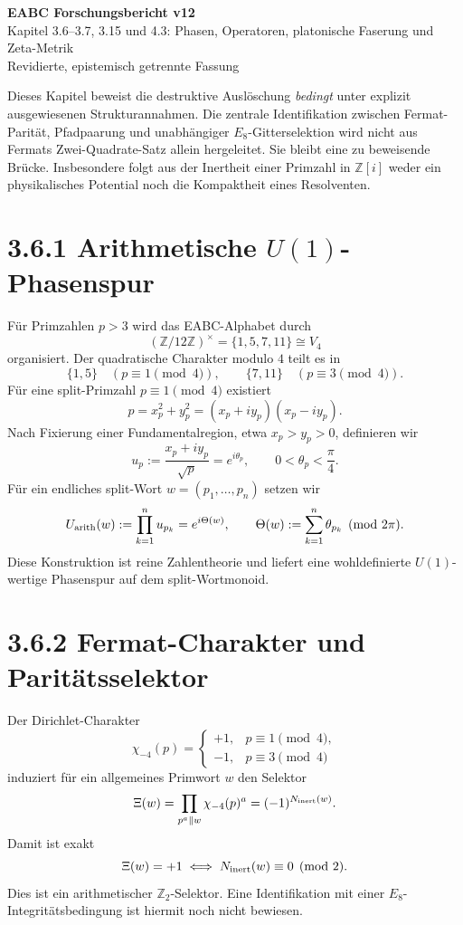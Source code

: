 \documentclass[11pt,a4paper]{article}
\begin{document}
\begin{center}
{\Large\bfseries EABC Forschungsbericht v12}\\[2mm]
{\large Kapitel 3.6--3.7, 3.15 und 4.3: Phasen, Operatoren, platonische Faserung und Zeta-Metrik}\\[1mm]
{\small Revidierte, epistemisch getrennte Fassung}
\end{center}

\begin{warningbox}
Dieses Kapitel beweist die destruktive Auslöschung \emph{bedingt} unter explizit ausgewiesenen Strukturannahmen. Die zentrale Identifikation zwischen Fermat-Parität, Pfadpaarung und unabhängiger $E_8$-Gitterselektion wird nicht aus Fermats Zwei-Quadrate-Satz allein hergeleitet. Sie bleibt eine zu beweisende Brücke. Insbesondere folgt aus der Inertheit einer Primzahl in $\mathbb Z[i]$ weder ein physikalisches Potential noch die Kompaktheit eines Resolventen.
\end{warningbox}

\section*{3.6.1 Arithmetische $U(1)$-Phasenspur}
Für Primzahlen $p>3$ wird das EABC-Alphabet durch
\[
(\mathbb Z/12\mathbb Z)^\times=\{1,5,7,11\}\cong V_4
\]
organisiert. Der quadratische Charakter modulo $4$ teilt es in
\[
\{1,5\}\quad (p\equiv1\!\!\pmod4),\qquad
\{7,11\}\quad (p\equiv3\!\!\pmod4).
\]
Für eine split-Primzahl $p\equiv1\pmod4$ existiert
\[
p=x_p^2+y_p^2=(x_p+i y_p)(x_p-i y_p).
\]
Nach Fixierung einer Fundamentalregion, etwa $x_p>y_p>0$, definieren wir
\[
u_p:=\frac{x_p+i y_p}{\sqrt p}=e^{i\theta_p},\qquad
0<\theta_p<\frac\pi4.
\]
Für ein endliches split-Wort $w=(p_1,\ldots,p_n)$ setzen wir
\[
U_{\rm arith}(w):=\prod_{k=1}^n u_{p_k}=e^{i\Theta(w)},\qquad
\Theta(w):=\sum_{k=1}^n\theta_{p_k}\pmod{2\pi}.
\]
Diese Konstruktion ist reine Zahlentheorie und liefert eine wohldefinierte $U(1)$-wertige Phasenspur auf dem split-Wortmonoid.

\section*{3.6.2 Fermat-Charakter und Paritätsselektor}
Der Dirichlet-Charakter
\[
\chi_{-4}(p)=\begin{cases}
+1,&p\equiv1\pmod4,\\
-1,&p\equiv3\pmod4
\end{cases}
\]
induziert für ein allgemeines Primwort $w$ den Selektor
\[
\Xi(w)=\prod_{p^a\parallel w}\chi_{-4}(p)^a=(-1)^{N_{\rm inert}(w)}.
\]
Damit ist exakt
\[
\Xi(w)=+1\iff N_{\rm inert}(w)\equiv0\pmod2.
\]
Dies ist ein arithmetischer $\mathbb Z_2$-Selektor. Eine Identifikation mit einer $E_8$-Integritätsbedingung ist hiermit noch nicht bewiesen.
\end{document}
